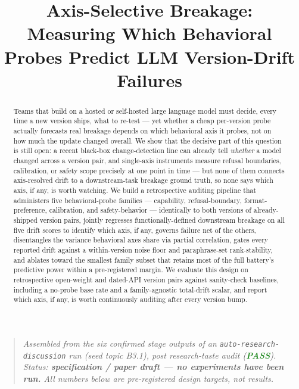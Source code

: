 \documentclass[11pt]{article}
\title{\textbf{Axis-Selective Breakage:\\ Measuring Which Behavioral Probes Predict LLM Version-Drift Failures}}
\author{}
\date{}
\begin{document}
\maketitle
\vspace{-2em}

\begin{quote}
\small\textit{Assembled from the six confirmed stage outputs of an \texttt{auto-research-discussion} run (seed topic B3.1), post research-taste audit (\textcolor{ForestGreen}{\textbf{PASS}}). Status: \textbf{specification / paper draft --- no experiments have been run.} All numbers below are pre-registered design targets, not results.}
\end{quote}

\begin{abstract}
Teams that build on a hosted or self-hosted large language model must decide, every time a new version ships, what to re-test --- yet whether a cheap per-version probe actually forecasts real breakage depends on which behavioral axis it probes, not on how much the update changed overall. We show that the decisive part of this question is still open: a recent black-box change-detection line can already tell \emph{whether} a model changed across a version pair, and single-axis instruments measure refusal boundaries, calibration, or safety scope precisely at one point in time --- but none of them connects axis-resolved drift to a downstream-task breakage ground truth, so none says which axis, if any, is worth watching. We build a retrospective auditing pipeline that administers five behavioral-probe families --- capability, refusal-boundary, format-preference, calibration, and safety-behavior --- identically to both versions of already-shipped version pairs, jointly regresses functionally-defined downstream breakage on all five drift scores to identify which axis, if any, governs failure net of the others, disentangles the variance behavioral axes share via partial correlation, gates every reported drift against a within-version noise floor and paraphrase-set rank-stability, and ablates toward the smallest family subset that retains most of the full battery's predictive power within a pre-registered margin. We evaluate this design on retrospective open-weight and dated-API version pairs against sanity-check baselines, including a no-probe base rate and a family-agnostic total-drift scalar, and report which axis, if any, is worth continuously auditing after every version bump.
\end{abstract}
\end{document}
